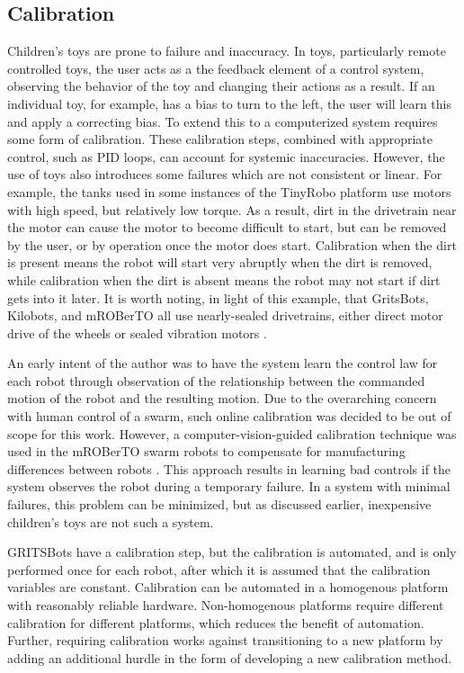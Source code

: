 \subsection{Calibration} \label{section:Calibration}

Children's toys are prone to failure and inaccuracy.
In toys, particularly remote controlled toys, the user acts as a the feedback element of a control system, observing the behavior of the toy and changing their actions as a result. 
If an individual toy, for example, has a bias to turn to the left, the user will learn this and apply a correcting bias.
To extend this to a computerized system requires some form of calibration. 
These calibration steps, combined with appropriate control, such as PID loops, can account for systemic inaccuracies. 
However, the use of toys also introduces some failures which are not consistent or linear. 
For example, the tanks used in some instances of the TinyRobo platform use motors with high speed, but relatively low torque. 
As a result, dirt in the drivetrain near the motor can cause the motor to become difficult to start, but can be removed by the user, or by operation once the motor does start. 
Calibration when the dirt is present means the robot will start very abruptly when the dirt is removed, while calibration when the dirt is absent means the robot may not start if dirt gets into it later. 
It is worth noting, in light of this example, that GritsBots, Kilobots, and mROBerTO all use nearly-sealed drivetrains, either direct motor drive of the wheels or sealed vibration motors \citep{rubenstein2014kilobot, pickem2015gritsbot, Kim2016mROBerTOAM}. 

An early intent of the author was to have the system learn the control law for each robot through observation of the relationship between the commanded motion of the robot and the resulting motion. 
Due to the overarching concern with human control of a swarm, such online calibration was decided to be out of scope for this work. 
However, a computer-vision-guided calibration technique was used in the mROBerTO swarm robots to compensate for manufacturing differences between robots \citep{Kim2016mROBerTOAM}. 
This approach results in learning bad controls if the system observes the robot during a temporary failure. 
In a system with minimal failures, this problem can be minimized, but as discussed earlier, inexpensive children's toys are not such a system. 

GRITSBots have a calibration step, but the calibration is automated, and is only performed once for each robot, after which it is assumed that the calibration variables are constant.
Calibration can be automated in a homogenous platform with reasonably reliable hardware. 
Non-homogenous platforms require different calibration for different platforms, which reduces the benefit of automation. 
Further, requiring calibration works against transitioning to a new platform by adding an additional hurdle in the form of developing a new calibration method.

